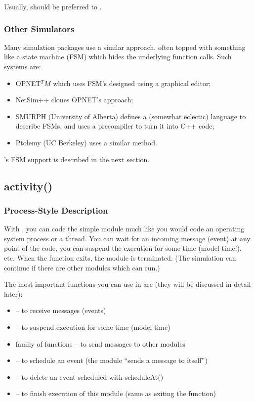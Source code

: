 Usually,  should be preferred to .


\subsubsection{Other Simulators}


Many simulation packages use a similar approach, often topped with
something like a state machine
(FSM) which hides the underlying function calls. Such
systems are:
\begin{itemize}
  \item{OPNET$^TM$ which uses FSM's designed using a graphical editor;}
  \item{NetSim++ clones OPNET's approach;}
  \item{SMURPH (University of Alberta) defines a (somewhat eclectic)
      language to describe FSMs, and uses a precompiler to turn it
      into C++ code;}
  \item{Ptolemy (UC Berkeley) uses a similar method.}
\end{itemize}

{\opp}'s FSM support is described in the next section.



\subsection{activity()}
\label{sec:simple-modules:activity}

\subsubsection{Process-Style Description}

With , you can code the simple
module much like you would code an operating system process or a
thread. You can wait for an incoming message (event) at any point of
the code, you can suspend the execution for some time (model time!),
etc. When the  function exits, the module is
terminated.  (The simulation can continue if there are other modules
which can run.)


The most important functions you can use in  are
(they will be discussed in detail later):
\begin{itemize}
\item{ -- to receive messages (events)}
\item{ -- to suspend execution
    for some time (model time)}
\item{ family of functions -- to send messages to other
    modules}
\item{ -- to schedule an event (the module ``sends
    a message to itself'')}
\item{ -- to delete an event scheduled with
    scheduleAt()}
\item{ -- to finish execution of this module (same as
    exiting the  function)}
\end{itemize}

